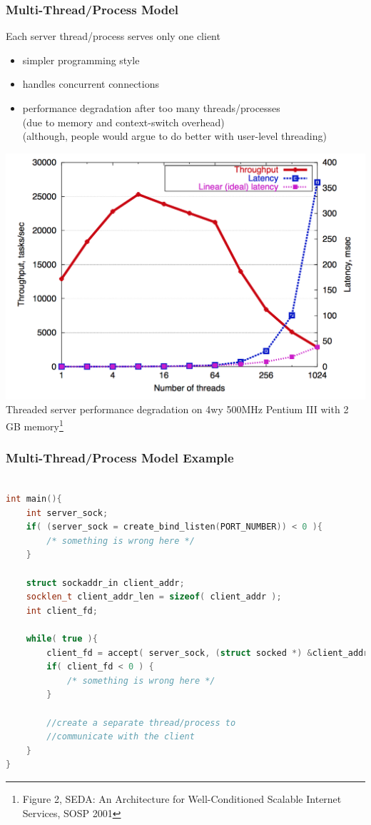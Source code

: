 \documentclass[aspectratio=43]{beamer}
\begin{document}
\begin{frame}[fragile]
  \frametitle{Multi-Thread/Process Model}
  Each server thread/process serves only one client\\
  \begin{itemize}
  \item simpler programming style
  \item handles concurrent connections
  \item performance degradation after too many threads/processes\\
  {\scriptsize (due to memory and context-switch overhead)}\\
  {\scriptsize (although, people would argue to do better with user-level threading)}
  \end{itemize}
  
  \begin{center}
   \includegraphics[scale=0.3]{server_mp_degrade.png}\\
   {\tiny Threaded server performance degradation on 4wy 500MHz Pentium III with 2 GB memory\footnote{\tiny Figure 2, SEDA: An Architecture for Well-Conditioned Scalable Internet Services, SOSP 2001}}
  \end{center}
\end{frame}
\begin{frame}[fragile]
  \frametitle{Multi-Thread/Process Model Example}
  \begin{lstlisting}[language=C++,basicstyle=\ttfamily\footnotesize,commentstyle=\color{commgreen},keywordstyle=\color{blue},breaklines=true]

int main(){
    int server_sock;
    if( (server_sock = create_bind_listen(PORT_NUMBER)) < 0 ){
        /* something is wrong here */
    }
    
    struct sockaddr_in client_addr;
    socklen_t client_addr_len = sizeof( client_addr );
    int client_fd;
    
    while( true ){
        client_fd = accept( server_sock, (struct socked *) &client_addr, &client_addr_len );
        if( client_fd < 0 ) {
            /* something is wrong here */
        }
        
        //create a separate thread/process to
        //communicate with the client
    }
}
\end{lstlisting}
\end{frame}
\end{document}
